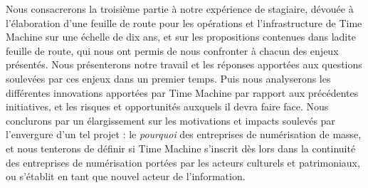 Nous consacrerons la troisième partie à notre expérience de stagiaire, dévouée à l'élaboration d'une feuille de route pour les opérations et l'infrastructure de Time Machine sur une échelle de dix ans, et sur les propositions contenues dans ladite feuille de route, qui nous ont permis de nous confronter à chacun des enjeux présentés. Nous présenterons notre travail et les réponses apportées aux questions soulevées par ces enjeux dans un premier temps. Puis nous analyserons les différentes innovations apportées par Time Machine par rapport aux précédentes initiatives, et les risques et opportunités auxquels il devra faire face. Nous conclurons par un élargissement sur les motivations et impacts soulevés par l'envergure d'un tel projet : le \textit{pourquoi} des entreprises de numérisation de masse, et nous tenterons de définir si Time Machine s'inscrit dès lors dans la continuité des entreprises de numérisation portées par les acteurs culturels et patrimoniaux, ou s'établit en tant que nouvel acteur de l'information.








